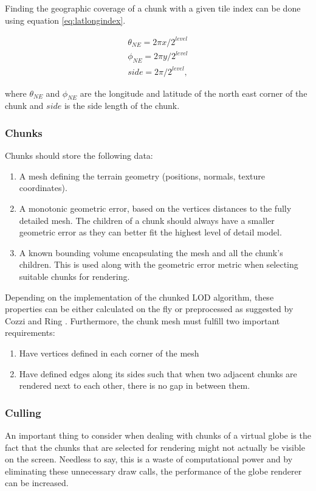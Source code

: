 Finding the geographic coverage of a chunk with a given tile index can be done using equation \ref{eq:latlongindex}.

\begin{equation}
\label{eq:latlongindex}
\begin{split}
\theta_{NE} = 2\pi x / 2^{level} \\
\phi_{NE} = 2\pi y / 2^{level} \\
side = 2\pi / 2^{level},
\end{split} 
\end{equation}

where $\theta_{NE}$ and $\phi_{NE}$ are the longitude and latitude of the north east corner of the chunk and $side$ is the side length of the chunk.

\subsubsection{Chunks}
Chunks should store the following data:

\begin{enumerate}
    \item A mesh defining the terrain geometry (positions, normals, texture coordinates). 
    \item A monotonic geometric error, based on the vertices distances to the fully detailed mesh. The children of a chunk should always have a smaller geometric error as they can better fit the highest level of detail model.
    \item A known bounding volume encapsulating the mesh and all the chunk's children. This is used along with the geometric error metric when selecting suitable chunks for rendering.
\end{enumerate}

Depending on the implementation of the chunked LOD algorithm, these properties can be either calculated on the fly or preprocessed as suggested by Cozzi and Ring \cite[p. 447]{cozzi11}. Furthermore, the chunk mesh must fulfill two important requirements: 

\begin{enumerate}
    \item Have vertices defined in each corner of the mesh
    \item Have defined edges along its sides such that when two adjacent chunks are rendered next to each other, there is no gap in between them.
\end{enumerate}

\subsubsection{Culling}
An important thing to consider when dealing with chunks of a virtual globe is the fact that the chunks that are selected for rendering might not actually be visible on the screen. Needless to say, this is a waste of computational power and by eliminating these unnecessary draw calls, the performance of the globe renderer can be increased.

